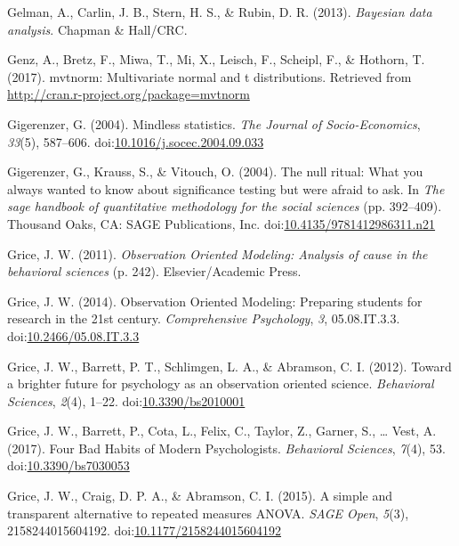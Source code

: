 \documentclass[,man, mask]{apa6}
\theoremstyle{definition}
\theoremstyle{definition}
\theoremstyle{definition}
\theoremstyle{remark}
\begin{document}
\hypertarget{ref-Gelman2004}{}
Gelman, A., Carlin, J. B., Stern, H. S., \& Rubin, D. R. (2013).
\emph{Bayesian data analysis}. Chapman \& Hall/CRC.

\hypertarget{ref-Genz2017}{}
Genz, A., Bretz, F., Miwa, T., Mi, X., Leisch, F., Scheipl, F., \&
Hothorn, T. (2017). mvtnorm: Multivariate normal and t distributions.
Retrieved from \url{http://cran.r-project.org/package=mvtnorm}

\hypertarget{ref-Gigerenzer2004}{}
Gigerenzer, G. (2004). Mindless statistics. \emph{The Journal of
Socio-Economics}, \emph{33}(5), 587--606.
doi:\href{https://doi.org/10.1016/j.socec.2004.09.033}{10.1016/j.socec.2004.09.033}

\hypertarget{ref-Gigerenzer2004a}{}
Gigerenzer, G., Krauss, S., \& Vitouch, O. (2004). The null ritual: What
you always wanted to know about significance testing but were afraid to
ask. In \emph{The sage handbook of quantitative methodology for the
social sciences} (pp. 392--409). Thousand Oaks, CA: SAGE Publications,
Inc.
doi:\href{https://doi.org/10.4135/9781412986311.n21}{10.4135/9781412986311.n21}

\hypertarget{ref-Grice2011}{}
Grice, J. W. (2011). \emph{Observation Oriented Modeling: Analysis of
cause in the behavioral sciences} (p. 242). Elsevier/Academic Press.

\hypertarget{ref-Grice2014}{}
Grice, J. W. (2014). Observation Oriented Modeling: Preparing students
for research in the 21st century. \emph{Comprehensive Psychology},
\emph{3}, 05.08.IT.3.3.
doi:\href{https://doi.org/10.2466/05.08.IT.3.3}{10.2466/05.08.IT.3.3}

\hypertarget{ref-Grice2012}{}
Grice, J. W., Barrett, P. T., Schlimgen, L. A., \& Abramson, C. I.
(2012). Toward a brighter future for psychology as an observation
oriented science. \emph{Behavioral Sciences}, \emph{2}(4), 1--22.
doi:\href{https://doi.org/10.3390/bs2010001}{10.3390/bs2010001}

\hypertarget{ref-Grice2017}{}
Grice, J. W., Barrett, P., Cota, L., Felix, C., Taylor, Z., Garner, S.,
\ldots{} Vest, A. (2017). Four Bad Habits of Modern Psychologists.
\emph{Behavioral Sciences}, \emph{7}(4), 53.
doi:\href{https://doi.org/10.3390/bs7030053}{10.3390/bs7030053}

\hypertarget{ref-Grice2015}{}
Grice, J. W., Craig, D. P. A., \& Abramson, C. I. (2015). A simple and
transparent alternative to repeated measures ANOVA. \emph{SAGE Open},
\emph{5}(3), 2158244015604192.
doi:\href{https://doi.org/10.1177/2158244015604192}{10.1177/2158244015604192}
\end{document}
